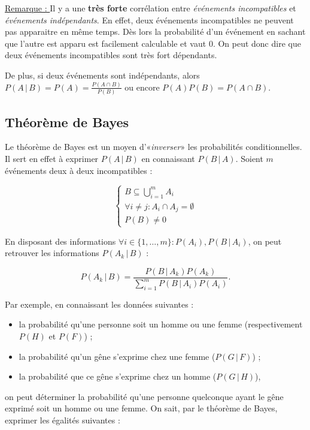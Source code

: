 \documentclass{article}
\begin{document}
		\underline{Remarque : } Il y a une \textbf{très forte} corrélation entre \textit{événements incompatibles} et \textit{événements indépendants}. En effet, deux
		événements incompatibles ne peuvent pas apparaitre en même temps. Dès lors la probabilité d'un événement en sachant que l'autre est apparu est facilement calculable et
		vaut $0$. On peut donc dire que deux événements incompatibles sont très fort dépendants.

		De plus, si deux événements sont indépendants, alors $P(A \, | \, B) = P(A)= \frac {P(A \cap B)}{P(B)}$ ou encore $P(A)P(B) = P(A \cap B)$.

	\subsection{Théorème de Bayes}
		Le théorème de Bayes est un moyen d'«\textit{inverser}» les probabilités conditionnelles. Il sert en effet à exprimer $P(A \, | \, B)$ en connaissant $P(B  \, | \, A)$.
		Soient $m$ événements deux à deux incompatibles :

		\[\left\{\begin{aligned}
			B \subseteq \bigcup_{i=1}^mA_i \\
			\forall i \neq j : A_i \cap A_j = \emptyset \\
			P(B) \neq 0
		\end{aligned}\right.\]

		En disposant des informations $\forall i \in \{1, \ldots, m\} : P(A_i), P(B \, | \, A_i)$, on peut retrouver les informations $P(A_k \, | \, B)$ :

		\[P(A_k \, | \, B) = \frac {P(B \, | \, A_k)P(A_k)}{\sum_{i=1}^mP(B \, | \, A_i)P(A_i)}.\]

		Par exemple, en connaissant les données suivantes :

		\begin{itemize}
			\item la probabilité qu'une personne soit un homme ou une femme (respectivement $P(H)$ et $P(F)$) ;
			\item la probabilité qu'un gêne s'exprime chez une femme ($P(G \, | \, F)$) ;
			\item la probabilité que ce gêne s'exprime chez un homme ($P(G \, | \, H)$),
		\end{itemize}

		on peut déterminer la probabilité qu'une personne quelconque ayant le gêne exprimé soit un homme ou une femme. On sait, par le théorème de Bayes, exprimer les
		égalités suivantes :
\end{document}
